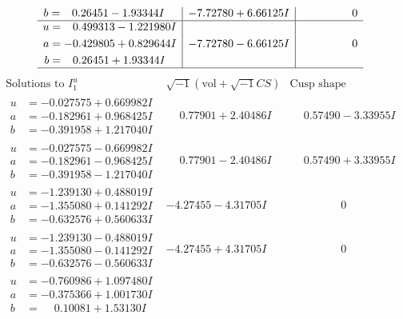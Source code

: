 \documentclass[1p]{elsarticle_modified}
\theoremstyle{definition}
\newcommand{\I}{\sqrt{-1}}
\begin{document}
$$\begin{array}{c|c|c}
\begin{aligned}
b &= \phantom{-}0.26451 - 1.93344 I\end{aligned}
 & -7.72780 + 6.66125 I & \phantom{-0.000000 } 0 \\ \hline\begin{aligned}
u &= \phantom{-}0.499313 - 1.221980 I \\
a &= -0.429805 + 0.829644 I \\
b &= \phantom{-}0.26451 + 1.93344 I\end{aligned}
 & -7.72780 - 6.66125 I & \phantom{-0.000000 } 0\\
 \hline 
 \end{array}$$\newpage$$\begin{array}{c|c|c}  
\text{Solutions to }I^u_{1}& \I (\text{vol} + \sqrt{-1}CS) & \text{Cusp shape}\\
 \hline 
\begin{aligned}
u &= -0.027575 + 0.669982 I \\
a &= -0.182961 + 0.968425 I \\
b &= -0.391958 + 1.217040 I\end{aligned}
 & \phantom{-}0.77901 + 2.40486 I & \phantom{-}0.57490 - 3.33955 I \\ \hline\begin{aligned}
u &= -0.027575 - 0.669982 I \\
a &= -0.182961 - 0.968425 I \\
b &= -0.391958 - 1.217040 I\end{aligned}
 & \phantom{-}0.77901 - 2.40486 I & \phantom{-}0.57490 + 3.33955 I \\ \hline\begin{aligned}
u &= -1.239130 + 0.488019 I \\
a &= -1.355080 + 0.141292 I \\
b &= -0.632576 + 0.560633 I\end{aligned}
 & -4.27455 - 4.31705 I & \phantom{-0.000000 } 0 \\ \hline\begin{aligned}
u &= -1.239130 - 0.488019 I \\
a &= -1.355080 - 0.141292 I \\
b &= -0.632576 - 0.560633 I\end{aligned}
 & -4.27455 + 4.31705 I & \phantom{-0.000000 } 0 \\ \hline\begin{aligned}
u &= -0.760986 + 1.097480 I \\
a &= -0.375366 + 1.001730 I \\
b &= \phantom{-}0.10081 + 1.53130 I\end{aligned}

\end{array}$$
\end{document}
